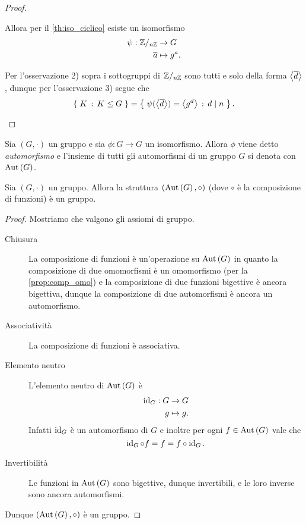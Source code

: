 \begin{proof}
\begin{enumerate}[label={(\roman*)}]
        Allora per il \autoref{th:iso_ciclico} esiste un isomorfismo \begin{align*}
            \psi : \Zmod n &\to G\\
            \eqclass a &\mapsto g^a.
        \end{align*}

        Per l'osservazione 2) sopra i sottogruppi di $\mathbb{Z}/_{n\mathbb{Z}}$ sono tutti e solo della forma $\displaystyle \cycl*{\eqclass{d}}$, dunque per l'osservazione 3) segue che \[
            \set{K \suchthat K \leq G} = \set{
                \psi(\cycl*{\eqclass{d}}) 
            = \cycl*{g^{d}} \suchthat d \divides n}. \qedhere   
        \] 
    \end{enumerate}
\end{proof}

\begin{definition}[Automorfismo]
    Sia $(G, \cdot)$ un gruppo e sia $\phi : G \to G$ un isomorfismo. Allora $\phi$ viene detto \emph{automorfismo} e l'insieme di tutti gli automorfismi di un gruppo $G$ si denota con $\operatorname{Aut}\left(G\right)$.
\end{definition}

\begin{proposition}
    Sia $(G, \cdot)$ un gruppo. Allora la struttura $(\operatorname{Aut}\left(G\right), \circ)$ (dove $\circ$ è la composizione di funzioni) è un gruppo.
\end{proposition}
\begin{proof}
    Mostriamo che valgono gli assiomi di gruppo.
    \begin{description}
        \item[Chiusura] La composizione di funzioni è un'operazione su $\operatorname{Aut}\left(G\right)$ in quanto la composizione di due omomorfismi è un omomorfismo (per la \autoref{prop:comp_omo}) e la composizione di due funzioni bigettive è ancora bigettiva, dunque la composizione di due automorfismi è ancora un automorfismo.
        \item[Associatività] La composizione di funzioni è associativa.
        \item[Elemento neutro] L'elemento neutro di $\operatorname{Aut}\left(G\right)$ è \begin{align*}
            \operatorname{id}_G : G &\to G \\
            g &\mapsto g.
        \end{align*}  Infatti $\operatorname{id}_G$ è un automorfismo di $G$ e inoltre per ogni $f \in \operatorname{Aut}\left(G\right)$ vale che\[
            \operatorname{id}_G \circ f = f = f \circ \operatorname{id}_G.
        \]
        \item[Invertibilità] Le funzioni in $\operatorname{Aut}\left(G\right)$ sono bigettive, dunque invertibili, e le loro inverse sono ancora automorfismi.
    \end{description}
    Dunque $(\operatorname{Aut}\left(G\right), \circ)$ è un gruppo.
\end{proof}

